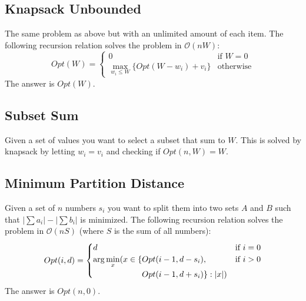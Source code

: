 \documentclass[8pt,a4paper,landscape,oneside]{amsart}
\newcommand{\bigO}{\mathcal{O}}
\begin{document}
\begin{multicols*}{3}
  \subsection{Knapsack Unbounded}
  The same problem as above but with an unlimited amount of each item. The following recursion relation solves the problem in $\bigO(nW)$:
  \[
  Opt(W) = \begin{cases}
  0 & \text{if } W=0 \\
  \max\limits_{w_i \leq W} \lbrace Opt(W-w_i) + v_i \rbrace & \text{otherwise}
  \end{cases}
  \]
  The answer is $Opt(W)$.
  
  \subsection{Subset Sum}
  \label{subset-sum}
  Given a set of values you want to select a subset that sum to $W$. This is solved by knapsack by letting $w_i = v_i$ and checking if $Opt(n, W) = W$.
  
  \subsection{Minimum Partition Distance}
  Given a set of $n$ numbers $s_i$ you want to split them into two sets $A$ and $B$ such that $|\sum a_i| - |\sum b_i|$ is minimized. The following recursion relation solves the problem in $\bigO(nS)$ (where $S$ is the sum of all numbers):
  \[
  Opt(i,d) = \begin{cases}
  d & \text{if } i=0 \\
  \begin{aligned}[t]\arraycolsep=0pt
    \arg\min\limits_x(x \in \{ & Opt(i-1,d-s_i), \\ &
    Opt(i-1,d+s_i)\} : |x|)
  \end{aligned} & \text{if } i > 0 \\
  
  \end{cases}
  \]
  The answer is $Opt(n, 0)$.
  

\end{multicols*}
\end{document}
